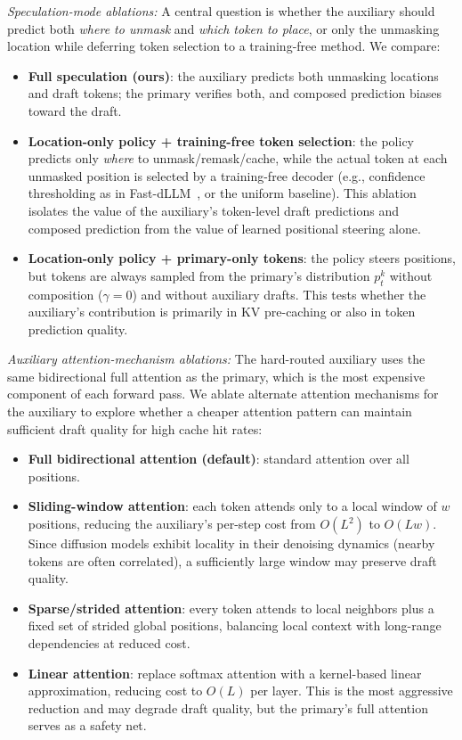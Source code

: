 \documentclass[11pt]{article}
\begin{document}
\emph{Speculation-mode ablations:}
A central question is whether the auxiliary should predict both \emph{where to unmask} and \emph{which token to place}, or only the unmasking location while deferring token selection to a training-free method.
We compare:
\begin{itemize}[leftmargin=*,itemsep=1pt]
    \item \textbf{Full speculation (ours)}: the auxiliary predicts both unmasking locations and draft tokens; the primary verifies both, and composed prediction biases toward the draft.
    \item \textbf{Location-only policy + training-free token selection}: the policy predicts only \emph{where} to unmask/remask/cache, while the actual token at each unmasked position is selected by a training-free decoder (e.g., confidence thresholding as in Fast-dLLM~\cite{wu2025fastdllm}, or the uniform baseline).
    This ablation isolates the value of the auxiliary's token-level draft predictions and composed prediction from the value of learned positional steering alone.
    \item \textbf{Location-only policy + primary-only tokens}: the policy steers positions, but tokens are always sampled from the primary's distribution $p_t^k$ without composition ($\gamma = 0$) and without auxiliary drafts.
    This tests whether the auxiliary's contribution is primarily in KV pre-caching or also in token prediction quality.
\end{itemize}

\emph{Auxiliary attention-mechanism ablations:}
The hard-routed auxiliary uses the same bidirectional full attention as the primary, which is the most expensive component of each forward pass.
We ablate alternate attention mechanisms for the auxiliary to explore whether a cheaper attention pattern can maintain sufficient draft quality for high cache hit rates:
\begin{itemize}[leftmargin=*,itemsep=1pt]
    \item \textbf{Full bidirectional attention (default)}: standard attention over all positions.
    \item \textbf{Sliding-window attention}: each token attends only to a local window of $w$ positions, reducing the auxiliary's per-step cost from $O(L^2)$ to $O(Lw)$.
    Since diffusion models exhibit locality in their denoising dynamics (nearby tokens are often correlated), a sufficiently large window may preserve draft quality.
    \item \textbf{Sparse/strided attention}: every token attends to local neighbors plus a fixed set of strided global positions, balancing local context with long-range dependencies at reduced cost.
    \item \textbf{Linear attention}: replace softmax attention with a kernel-based linear approximation, reducing cost to $O(L)$ per layer.
    This is the most aggressive reduction and may degrade draft quality, but the primary's full attention serves as a safety net.
\end{itemize}
\end{document}
